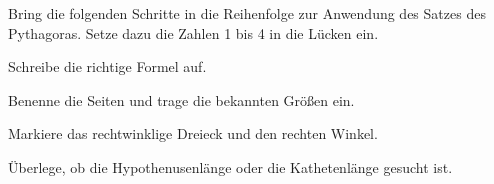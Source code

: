     \begin{minipage}{0.5 \textwidth}
    \end{minipage}%
        \begin{minipage}{0.3 \textwidth}
    \end{minipage}
    
\droptotalpoints

\question[3]
Bring die folgenden Schritte in die Reihenfolge zur Anwendung des Satzes des Pythagoras. Setze dazu die Zahlen 1 bis 4 in die Lücken ein. \hier

\item[\loeslin \textbf{Schritt:}] Schreibe die richtige Formel auf.
\item[\loeslin \textbf{Schritt:}] Benenne die Seiten und trage die bekannten Größen ein.
\item[\loeslin \textbf{Schritt:}] Markiere das rechtwinklige Dreieck und den rechten Winkel.
\item[\loeslin \textbf{Schritt:}] Überlege, ob die Hypothenusenlänge oder die Kathetenlänge gesucht ist.

\droptotalpoints

\medskip

\droptotalpoints
\question[4]

